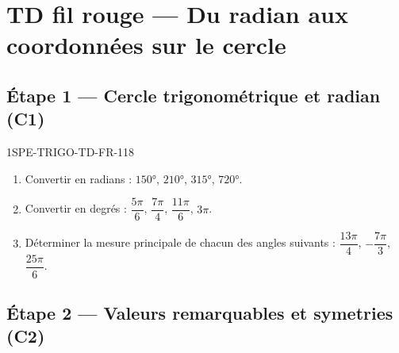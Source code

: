 

\section*{TD fil rouge — Du radian aux coordonnées sur le cercle}

\subsection*{Étape 1 — Cercle trigonométrique et radian (C1)}

\begin{exercice}{1SPE-TRIGO-TD-FR-1}{1}{8}
\begin{enumerate}
  \item Convertir en radians : $150°$, $210°$, $315°$, $720°$.
  \item Convertir en degrés : $\dfrac{5\pi}{6}$, $\dfrac{7\pi}{4}$, $\dfrac{11\pi}{6}$, $3\pi$.
  \item Déterminer la mesure principale de chacun des angles suivants : $\dfrac{13\pi}{4}$, $-\dfrac{7\pi}{3}$, $\dfrac{25\pi}{6}$.
\end{enumerate}
\end{exercice}


\subsection*{Étape 2 — Valeurs remarquables et symetries (C2)}

